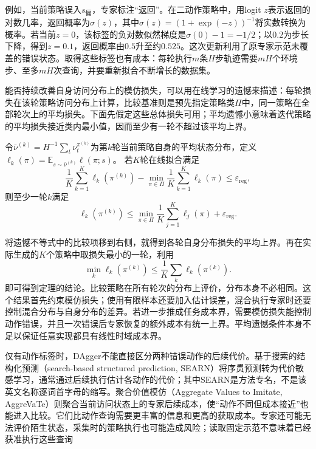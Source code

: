 例如，当前策略误入$s_{\text{偏}}$，专家标注“返回”。在二动作策略中，用logit $z$表示返回的对数几率，返回概率为$\sigma(z)$，其中$\sigma(z)=(1+\exp(-z))^{-1}$将实数转换为概率。若当前$z=0$，该标签的负对数似然梯度是$\sigma(0)-1=-1/2$；以$0.2$为步长下降，得到$z=0.1$，返回概率由$0.5$升至约$0.525$。这次更新利用了原专家示范未覆盖的错误状态。取得这些标签也有成本：每轮执行$m$条$H$步轨迹需要$mH$个环境步、至多$mH$次查询，并要重新拟合不断增长的数据集。

能否持续改善自身访问分布上的模仿损失，可以用在线学习的遗憾来描述：每轮损失在该轮策略访问分布上计算，比较基准则是预先指定策略类$\Pi$中，同一策略在全部轮次上的平均损失。下面先假定这些总体损失可用；平均遗憾小意味着迭代策略的平均损失接近类内最小值，因而至少有一轮不超过该平均上界。

\begin{theorem}[理想化DAgger的无遗憾归约]
  \label{thm:rl-reward-dagger}
  令$\bar\nu^{(k)}=H^{-1}\sum_t\nu_t^{\pi^{(k)}}$为第$k$轮当前策略自身的平均状态分布，定义
  $\ell_k(\pi)=\mathbb E_{s\sim\bar\nu^{(k)}}\ell(\pi;s)$。
  若$K$轮在线拟合满足
  \[
    \frac1K\sum_{k=1}^K\ell_k(\pi^{(k)})
    -\min_{\pi\in\Pi}\frac1K\sum_{k=1}^K\ell_k(\pi)
    \leq\varepsilon_{\mathrm{reg}},
  \]
  则至少一轮$k$满足
  \[
    \ell_k(\pi^{(k)})
    \leq\min_{\pi\in\Pi}\frac1K\sum_{j=1}^K\ell_j(\pi)
        +\varepsilon_{\mathrm{reg}}.
  \]
\end{theorem}

将遗憾不等式中的比较项移到右侧，就得到各轮自身分布损失的平均上界。再在实际生成的$K$个策略中取损失最小的一轮，利用
\[
  \min_k\ell_k(\pi^{(k)})
  \leq\frac1K\sum_k\ell_k(\pi^{(k)}).
\]
即可得到定理的结论。比较策略在所有轮次的分布上评价，分布本身不必相同。这个结果首先约束模仿损失；使用有限样本还要加入估计误差，混合执行专家时还要控制混合分布与自身分布的差异。若进一步推成任务成本界，需要模仿损失能控制动作错误，并且一次错误后专家恢复的额外成本有统一上界。平均遗憾条件本身不足以保证任意实现都具有线性时域成本界。

仅有动作标签时，DAgger不能直接区分两种错误动作的后续代价。基于搜索的结构化预测（search-based structured prediction, SEARN）将序贯预测转为代价敏感学习，通常通过后续执行估计各动作的代价；其中SEARN是方法专名，不是该英文名称逐词首字母的缩写。聚合价值模仿（Aggregate Values to Imitate, AggreVaTe）则聚合当前访问状态上的专家后续成本，使“动作不同但成本接近”也能进入比较。它们比动作查询需要更丰富的信息和更高的获取成本。专家还可能无法评价陌生状态，采集时的策略执行也可能造成风险；读取固定示范不意味着已经获准执行这些查询

